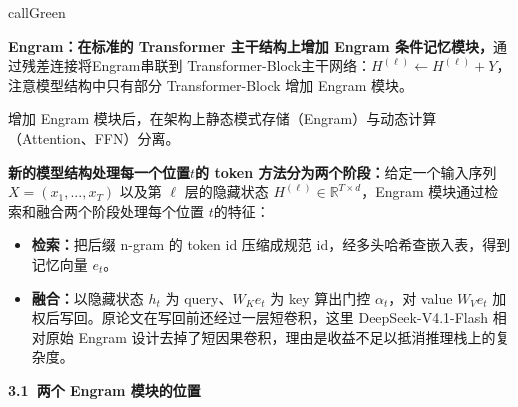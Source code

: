 \documentclass[zihao=false,fontset=windows]{ctexart}
\begin{document}
\begin{feishubox}{callGreen}{🧭}

\textcolor{feishuRed}{\textbf{Engram：在标准的 Transformer 主干结构上增加 Engram 条件记忆模块，}}通过残差连接将Engram串联到 Transformer-Block主干网络：$H^{(\ell)}\leftarrow H^{(\ell)}+Y$，\textcolor{feishuRed}{注意模型结构中只有部分 Transformer-Block 增加 Engram 模块。}\par

增加 Engram 模块后，在架构上静态模式存储（Engram）与动态计算（Attention、FFN）分离。\par

\textcolor{feishuRed}{\textbf{新的模型结构处理每一个位置}}$t$\textcolor{feishuRed}{\textbf{的 token 方法分为两个阶段：}}给定一个输入序列 $X=(x_1,...,x_T)$ 以及第 $\ell$ 层的隐藏状态 $H^{(\ell)}\in\mathbb{R}^{T\times d}$，Engram\textcolor{feishuRed}{\textbf{ }}模块通过\textcolor{feishuRed}{检索和融合两个阶段}处理每个位置 $t$的特征：\par
\begin{itemize}
\item 
\textbf{检索：}把后缀 n-gram 的 token id 压缩成规范 id，经多头哈希查嵌入表，得到记忆向量 $e_t$。\par
\item 
\textbf{融合：}以隐藏状态 $h_t$ 为 query、$W_K e_t$ 为 key 算出门控 $\alpha_t$，对 value $W_V e_t$ 加权后写回。原论文在写回前还经过一层短卷积，这里 DeepSeek-V4.1-Flash 相对原始 Engram 设计去掉了短因果卷积，理由是收益不足以抵消推理栈上的复杂度。\par
\end{itemize}
\end{feishubox}

\par{}\vspace{0.8em}\noindent \begin{tcolorbox}[boxrule=0pt,arc=3pt,colback=callOrange,left=3pt,right=3pt,top=2pt,bottom=2pt,before skip=0pt,after skip=0pt]{\bfseries \textcolor{feishuBlue}{3.1}\ 两个 Engram 模块的位置}\end{tcolorbox}\par\vspace{0.28em}
\end{document}
